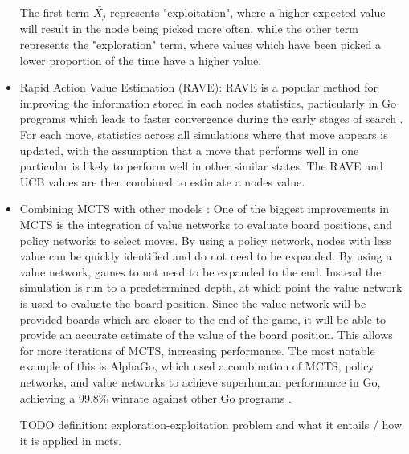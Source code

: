 \begin{itemize}
    The first term $\bar{X_j}$ represents "exploitation", where a higher expected value will result in the node being picked more often, while the other term represents the "exploration" term, where values which have been picked a lower proportion of the time have a higher value.

    \item Rapid Action Value Estimation (RAVE): RAVE is a popular method for improving the information stored in each nodes statistics, particularly in Go programs which leads to faster convergence during the early stages of search \cite{GellySilver2007}. For each move, statistics across all simulations where that move appears is updated, with the assumption that a move that performs well in one particular is likely to perform well in other similar states. The RAVE and UCB values are then combined to estimate a nodes value.

    \item Combining MCTS with other models \cite{44806} \cite{Browne2012}: 
    One of the biggest improvements in MCTS is the integration of value networks to evaluate board positions, and policy networks to select moves. 
    By using a policy network, nodes with less value can be quickly identified and do not need to be expanded.
    By using a value network, games to not need to be expanded to the end.
    Instead the simulation is run to a predetermined depth, at which point the value network is used to evaluate the board position.
    Since the value network will be provided boards which are closer to the end of the game, it will be able to provide an accurate estimate of the value of the board position.
    This allows for more iterations of MCTS, increasing performance. The most notable example of this is AlphaGo, which used a combination of MCTS, policy networks, and value networks to achieve superhuman performance in Go, achieving a 99.8\% winrate against other Go programs \cite{44806}.

    
TODO definition: exploration-exploitation problem and what it entails / how it is applied in mcts. 
\end{itemize} 

